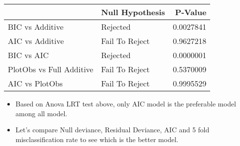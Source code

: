 \documentclass[
]{article}
\newenvironment{Shaded}{\begin{snugshade}}{\end{snugshade}}
\newcommand{\DataTypeTok}[1]{\textcolor[rgb]{0.13,0.29,0.53}{#1}}
\newcommand{\KeywordTok}[1]{\textcolor[rgb]{0.13,0.29,0.53}{\textbf{#1}}}
\newcommand{\NormalTok}[1]{#1}
\newcommand{\OperatorTok}[1]{\textcolor[rgb]{0.81,0.36,0.00}{\textbf{#1}}}
\newcommand{\StringTok}[1]{\textcolor[rgb]{0.31,0.60,0.02}{#1}}
\begin{document}
\begin{Shaded}
\end{Shaded}

\begin{table}[H]
\centering
\begin{tabular}{l|l|r}
\hline
  & Null Hypothesis & P-Value\\
\hline
BIC vs Additive & Rejected & 0.0027841\\
\hline
AIC vs Additive & Fail To Reject & 0.9627218\\
\hline
BIC vs AIC & Rejected & 0.0000001\\
\hline
PlotObs vs Full Additive & Fail To Reject & 0.5370009\\
\hline
AIC vs PlotObs & Fail To Reject & 0.9995529\\
\hline
\end{tabular}
\end{table}

\begin{itemize}
\item
  Based on Anova LRT test above, only AIC model is the preferable model
  among all model.
\item
  Let's compare Null deviance, Residual Deviance, AIC and 5 fold
  misclassification rate to see which is the better model.
\end{itemize}
\end{document}
